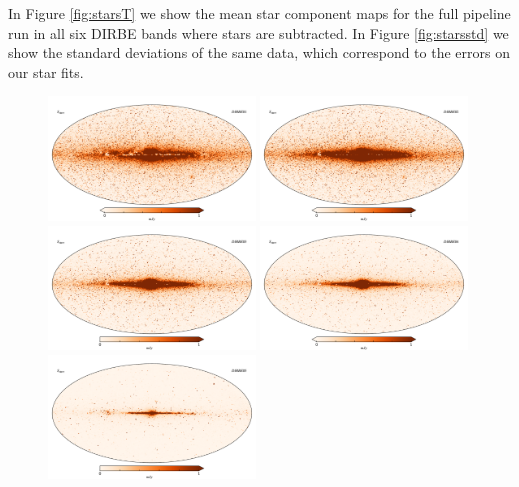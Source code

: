 \documentclass{aa}
\begin{document}
In Figure \ref{fig:starsT} we show the mean star component maps for the full pipeline run in all six DIRBE bands where stars are subtracted. In Figure \ref{fig:starsstd} we show the standard deviations of the same data, which correspond to the errors on our star fits. 

\begin{figure}
  \centering
  \includegraphics[width=0.49\textwidth]{figs/starmaps/stars_mean_01.pdf}
  \includegraphics[width=0.49\textwidth]{figs/starmaps/stars_mean_02.pdf} \\
  \includegraphics[width=0.49\textwidth]{figs/starmaps/stars_mean_03.pdf}
  \includegraphics[width=0.49\textwidth]{figs/starmaps/stars_mean_04.pdf} \\
  \includegraphics[width=0.49\textwidth]{figs/starmaps/stars_mean_05.pdf}

\end{figure}
\end{document}
